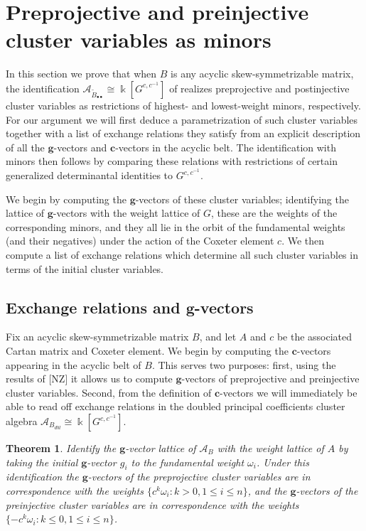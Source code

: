 \documentclass[12pt]{amsart}
\newcommand{\cA}{\mathcal{A}}
\newcommand{\kk}{\Bbbk}%
\newcommand{\bfc}{\mathbf{c}}
\newcommand{\bfg}{\mathbf{g}}
\newtheorem{theorem}{Theorem}[section]
\theoremstyle{remark}
\numberwithin{equation}{section}
\begin{document}
\section{Preprojective and preinjective cluster variables as minors}
In this section we prove that when $B$ is any acyclic skew-symmetrizable matrix, the identification $\cA_{\widetilde B_{\bullet\bullet}} \cong \kk[G^{c,c^{-1}}]$ of  realizes preprojective and postinjective cluster variables as restrictions of highest- and lowest-weight minors, respectively. 
For our argument we will first deduce a parametrization of such cluster variables together with a list of exchange relations they satisfy from an explicit description of all the $\bfg$-vectors and $\bfc$-vectors in the acyclic belt.
The identification with minors then follows by comparing these relations with restrictions of certain generalized determinantal identities to $G^{c,c^{-1}}$.

We begin by computing the $\bfg$-vectors of these cluster variables; identifying the lattice of $\bfg$-vectors with the weight lattice of $G$, these are the weights of the corresponding minors, and they all lie in the orbit of the fundamental weights (and their negatives) under the action of the Coxeter element $c$. We then compute a list of exchange relations which determine all such cluster variables in terms of the initial cluster variables. 

\subsection{Exchange relations and $\bfg$-vectors}\label{sec:exchange}

Fix an acyclic skew-symmetrizable matrix $B$, and let $A$ and $c$ be the associated Cartan matrix and Coxeter element. We begin by computing the $\bfc$-vectors appearing in the acyclic belt of $B$. This serves two purposes: first, using the results of [NZ] it allows us to compute $\bfg$-vectors of preprojective and preinjective cluster variables. Second, from the definition of $\bfc$-vectors we will immediately be able to read off exchange relations in the doubled principal coefficients cluster algebra $\cA_{B_{dbl}} \cong \kk[G^{c,c^{-1}}]$.

\begin{theorem}
Identify the $\bfg$-vector lattice of $\cA_B$ with the weight lattice of $A$ by taking the initial $\bfg$-vector $g_i$ to the fundamental weight $\omega_i$. Under this identification the $\bfg$-vectors of the preprojective cluster variables are in correspondence with the weights $\{c^k\omega_i : k > 0, 1 \leq i \leq n\}$, and the $\bfg$-vectors of the preinjective cluster variables are in correspondence with the weights $\{-c^k\omega_i : k \leq 0, 1 \leq i \leq n\}$.
\end{theorem}
\end{document}
